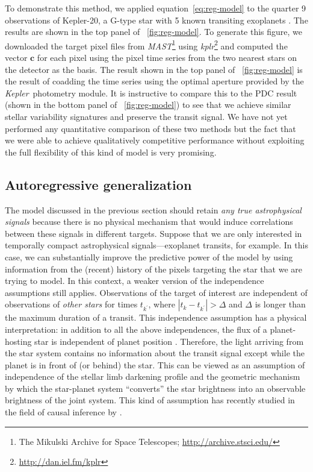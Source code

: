 \documentclass[letterpaper,12pt,whitepaper]{haastex}
\newcommand{\observatory}[1]{\textsl{#1}}
\newcommand{\Kepler}{\observatory{Kepler}}
\newcommand{\project}[1]{\textsl{#1}}
\newcommand{\MAST}{\project{MAST}}
\newcommand{\kplr}{\project{kplr}}
\begin{document}
To demonstrate this method, we applied equation~\ref{eq:reg-model} to the
quarter 9 observations of Kepler-20, a G-type star with 5 known transiting
exoplanets \citep{kepler20}.
The results are shown in the top panel of \figurename~\ref{fig:reg-model}.
To generate this figure, we downloaded the target pixel files from
\MAST\footnote{The Mikulski Archive for Space Telescopes;
\url{http://archive.stsci.edu/}} using
\kplr\footnote{\url{http://dan.iel.fm/kplr}}
and computed the vector $\mathbf{c}$ for each pixel using the pixel time
series from the two nearest stars on the detector as the basis.
The result shown in the top panel of \figurename~\ref{fig:reg-model} is the
result of coadding the time series using the optimal aperture provided by the
\Kepler\ photometry module.
It is instructive to compare this to the PDC result (shown in the bottom panel
of \figurename~\ref{fig:reg-model}) to see that we achieve similar stellar
variability signatures and preserve the transit signal.
We have not yet performed any quantitative comparison of these two methods but
the fact that we were able to achieve qualitatively competitive performance
without exploiting the full flexibility of this kind of model is very promising.

\subsection{Autoregressive generalization}
The model discussed in the previous section should retain \emph{any true
astrophysical signals} because there is no physical mechanism that would
induce correlations between these signals in different targets.
Suppose that we are only interested in temporally compact astrophysical
signals---exoplanet transits, for example.
In this case, we can substantially improve the predictive power of the model
by using information from the (recent) history of the pixels targeting the star
that we are trying to model.
In this context, a weaker version of the independence assumptions still
applies.
Observations of the target of interest are independent of observations of
\emph{other stars} for times $t_{k^\prime}$, where $|t_k - t_{k^\prime}| >
\Delta$ and $\Delta$ is longer than the maximum duration of a transit.
This independence assumption has a physical interpretation: in addition
to all the above independences, the flux of a planet-hosting star is
independent of planet position \citep[except in rare cases of close-in planets
that produce phase variations,][]{esteves2013}. Therefore, the light arriving
from the star system contains no information about the transit signal except
while the planet is in front of (or behind) the star.
This can be viewed as an assumption of independence of the stellar limb
darkening profile and the geometric mechanism by which the
star-planet system ``converts'' the star brightness into an observable
brightness of the joint system.
This kind of assumption has recently studied in the field of causal inference
by \citet{JanSch10}.
\end{document}
